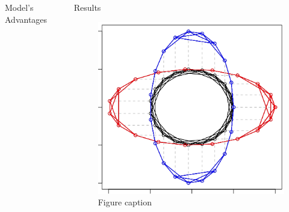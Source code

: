 \documentclass[final]{beamer}
\newlength{\onecolwid}
\newlength{\twocolwid}
\begin{document}
\begin{frame}[t]
\begin{columns}[t]
\begin{column}{\twocolwid}
\begin{columns}[t,totalwidth=\twocolwid]
\begin{column}{\onecolwid}
\begin{block}{Model's Advantages}
\end{block}


\end{column} %

\begin{column}{\onecolwid} %


\begin{block}{Results}

\begin{figure}
\includegraphics[width=0.8\linewidth]{error_daisy}
\caption{Figure caption}
\end{figure}




\end{block}
\end{column}
\end{columns}
\end{column}
\end{columns}
\end{frame}
\end{document}
